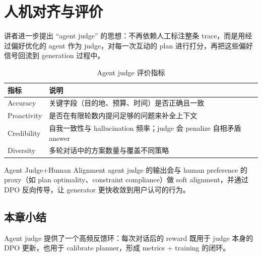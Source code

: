 \section{人机对齐与评价}

讲者进一步提出 ``agent judge'' 的思想：不再依赖人工标注整条 trace，而是用经过偏好优化的 agent 作为 judge，对每一次互动的 plan 进行打分，再把这些偏好信号回流到 generation 过程中。
\begin{table}[H]
\centering
\begin{tabular}{lp{6cm}}
\toprule
指标 & 说明 \\
\midrule
Accuracy & 关键字段（目的地、预算、时间）是否正确且一致 \\
Proactivity & 是否在有限轮数内提问足够的问题来补全上下文 \\
Credibility & 自我一致性与 hallucination 频率；judge 会 penalize 自相矛盾 answer \\
Diversity & 多轮对话中的方案数量与覆盖不同策略 \\
\bottomrule
\end{tabular}
\caption{Agent judge 评价指标}
\end{table}

\begin{knowledgebox}{Agent Judge+Human Alignment}
agent judge 的输出会与 human preference 的 proxy（如 plan optimality、constraint compliance）做 soft alignment，并通过 DPO 反向传导，让 generator 更快收敛到用户认可的行为。
\end{knowledgebox}

\subsection{本章小结}

Agent judge 提供了一个高频反馈环：每次对话后的 reward 既用于 judge 本身的 DPO 更新，也用于 calibrate planner，形成 metrics + training 的闭环。

